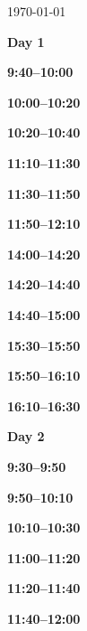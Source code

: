 \documentclass[12pt]{extbook}
\renewcommand{\dateseparator}{--}
\newcommand{\dayheader}[1]{
\clearpage
\begin{center}
\Large\bfseries Day #1
\end{center}
\bigskip}
\newcommand{\breaktime}[1]{
\bigskip
\begin{center}
\Large\bfseries ***** Break #1 *****
\end{center}
\bigskip}
\renewcommand{\breaktime}[1]{}
\newcommand{\abstract}[2]{{
\bigskip
\begin{center}
\large\bfseries #1
\end{center}}
\par

\clearpage
}
\begin{document}
\begin{center}
\begin{tabular}{r@{\hskip 0.5in}l}
\end{tabular}

\enlargethispage{2cm}
\vfill
\renewcommand{\dateseparator}{--}
{\hfill \tiny \today}

\end{center}






\dayheader{1}

\abstract{9:40--10:00}{abstracts/Daskalopoulou} %
\abstract{10:00--10:20}{abstracts/Kimani} %
\abstract{10:20--10:40}{abstracts/Mtili} %

\breaktime{30 min}

\abstract{11:10--11:30}{abstracts/Giroud} %
\abstract{11:30--11:50}{abstracts/Roques} %
\abstract{11:50--12:10}{abstracts/Lightfoot} %

\breaktime{ / Lunch}

\abstract{14:00--14:20}{abstracts/Dutoit} %
\abstract{14:20--14:40}{abstracts/Strauch_Zimmer} %
\abstract{14:40--15:00}{abstracts/Finger} %

\breaktime{30 min}

\abstract{15:30--15:50}{abstracts/Kipfer} %
\abstract{15:50--16:10}{abstracts/vanRooyen} %
\abstract{16:10--16:30}{abstracts/Ortega} %


\dayheader{2}
\abstract{9:30--9:50}{abstracts/Jacops} %
\abstract{9:50--10:10}{abstracts/Tomonaga} %
\abstract{10:10--10:30}{abstracts/Kim} %

\breaktime{30 min}

\abstract{11:00--11:20}{abstracts/vanLeeuw} %
\abstract{11:20--11:40}{abstracts/Currle} %
\abstract{11:40--12:00}{abstracts/Wang} %
\end{document}
